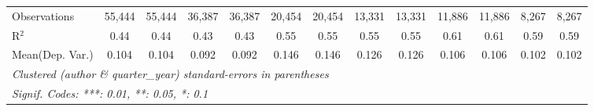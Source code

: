 \begin{tabular}{lcccccccccccc}
   Observations                             & 55,444        & 55,444        & 36,387        & 36,387    & 20,454       & 20,454       & 13,331  & 13,331       & 11,886  & 11,886         & 8,267   & 8,267\\  
   R$^2$                                    & 0.44          & 0.44          & 0.43          & 0.43      & 0.55         & 0.55         & 0.55    & 0.55         & 0.61    & 0.61           & 0.59    & 0.59\\  
Mean(Dep. Var.) & 0.104 & 0.104 & 0.092 & 0.092 & 0.146 & 0.146 & 0.126 & 0.126 & 0.106 & 0.106 & 0.102 & 0.102 \\
   \midrule \midrule
   \multicolumn{13}{l}{\emph{Clustered (author \& quarter\_year) standard-errors in parentheses}}\\
   \multicolumn{13}{l}{\emph{Signif. Codes: ***: 0.01, **: 0.05, *: 0.1}}\\
\end{tabular}
\par\endgroup
